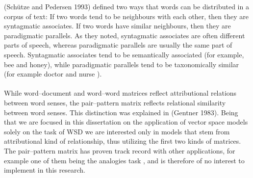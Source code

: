 (Sch\"utze and Pedersen 1993)\cite{schutze_pedersen1993} defined two ways that words can be 
distributed in a corpus of text: If two words tend to be neighbours with each other, then they are 
syntagmatic associates. If two words have similar neighbours, then they are paradigmatic parallels. As 
they noted, syntagmatic associates are often different parts of speech, whereas paradigmatic parallels 
are usually the same part of speech. Syntagmatic associates tend to be semantically associated (for 
example, bee and honey), while paradigmatic parallels tend to be taxonomically similar (for example 
doctor and nurse ).
\\\\  While word--document and word--word matrices reflect attributional relations between word 
senses, the pair--pattern matrix reflects relational similarity between word senses. This distinction was 
explained in (Gentner 1983)\cite{gentner83}. Being that we are focused in this dissertation on the 
application of vector space models solely on the task of WSD we are interested only in models that stem 
from attributional kind of relationship, thus utilizing the first two kinds of matrices. The pair--pattern 
matrix has proven track record with other applications, for example one of them being the analogies 
task \cite{cogprints4501}, and is therefore of no interest to implement in this research.